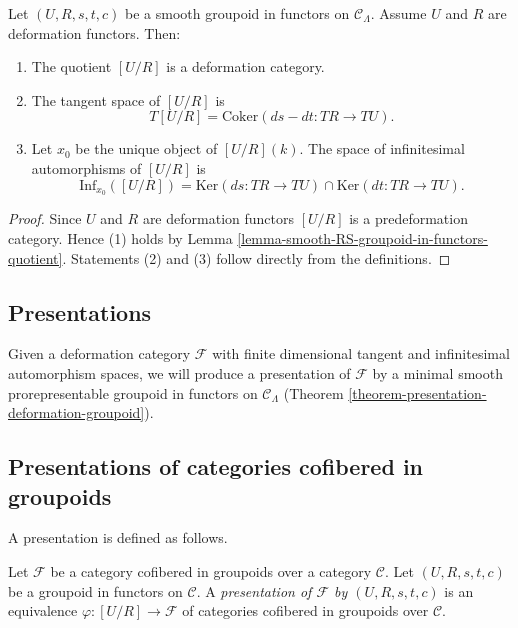 \begin{lemma}
\label{lemma-deformation-groupoid-quotient}
Let $(U, R, s,t,c)$ be a smooth groupoid in functors on $\mathcal{C}_\Lambda$. 
Assume $U$ and $R$ are deformation functors. Then:
\begin{enumerate}
\item The quotient $[U/R]$ is a deformation category.
\item The tangent space of $[U/R]$ is 
\[ T[U/R] = \text{Coker}(ds-dt: TR \to TU).
\]
\item Let $x_0$ be the unique object of $[U/R](k)$.  The space of infinitesimal 
automorphisms of $[U/R]$ is 
\[ \text{Inf}_{x_0}([U/R]) = \text{Ker}(ds: TR \to TU) \cap 
\text{Ker}(dt: TR \to TU).  
\]
\end{enumerate}
\end{lemma}

\begin{proof}
Since $U$ and $R$ are deformation functors $[U/R]$ is a predeformation 
category. Hence (1) holds by Lemma 
\ref{lemma-smooth-RS-groupoid-in-functors-quotient}.  Statements (2) and (3) 
follow directly from the definitions.
\end{proof}




\subsection{Presentations}
\label{subsection-presentations}
Given a deformation category $\mathcal{F}$ with finite dimensional tangent and 
infinitesimal automorphism spaces, we will produce a presentation of $\mathcal 
F$ by a minimal smooth prorepresentable groupoid in functors on $\mathcal 
C_\Lambda$ (Theorem \ref{theorem-presentation-deformation-groupoid}). 




\subsection{Presentations of categories cofibered in groupoids}
\label{subsection-presentation-categories-cofibred-in-groupoids}

\noindent
A presentation is defined as follows.

\begin{definition}
\label{definition-presentation}
Let $\mathcal{F}$ be a category cofibered in groupoids over a category $\mathcal 
C$.  Let $(U,R,s,t,c)$ be a groupoid in functors on $\mathcal{C}$.  A 
{\it presentation of $\mathcal{F}$ by $(U,R,s,t,c)$} is an equivalence 
$\varphi: [U/R] \to \mathcal{F}$ of categories cofibered in groupoids 
over $\mathcal{C}$.
\end{definition}


